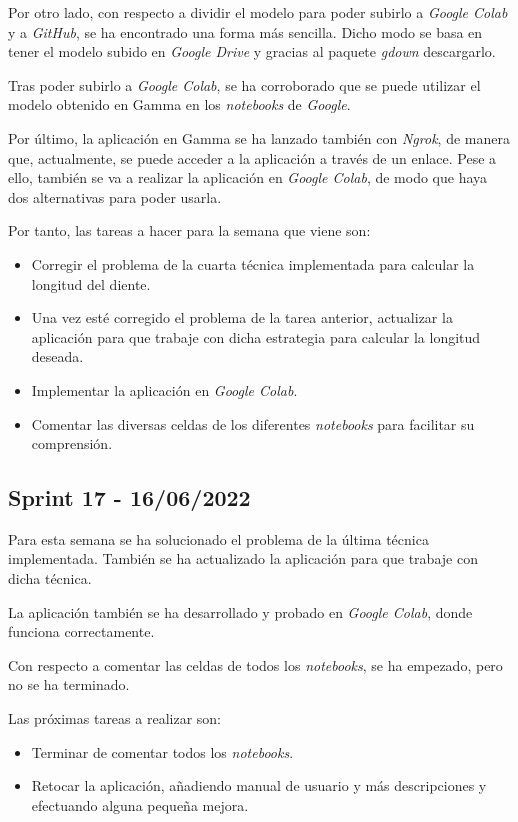 Por otro lado, con respecto a dividir el modelo para poder subirlo a \emph{Google Colab} y a \emph{GitHub}, se ha encontrado una forma más sencilla. Dicho modo se basa en tener el modelo subido en \emph{Google Drive} y gracias al paquete \emph{gdown} descargarlo.

Tras poder subirlo a \emph{Google Colab}, se ha corroborado que se puede utilizar el modelo obtenido en Gamma en los \emph{notebooks} de \emph{Google}.

Por último, la aplicación en Gamma se ha lanzado también con \emph{Ngrok}, de manera que, actualmente, se puede acceder a la aplicación a través de un enlace. Pese a ello, también se va a realizar la aplicación en \emph{Google Colab}, de modo que haya dos alternativas para poder usarla.

Por tanto, las tareas a hacer para la semana que viene son:
\begin{itemize}
    \item Corregir el problema de la cuarta técnica implementada para calcular la longitud del diente.
    \item Una vez esté corregido el problema de la tarea anterior, actualizar la aplicación para que trabaje con dicha estrategia para calcular la longitud deseada.
    \item Implementar la aplicación en \emph{Google Colab}.
    \item Comentar las diversas celdas de los diferentes \emph{notebooks} para facilitar su comprensión. 
\end{itemize}

\subsection{Sprint 17 - 16/06/2022}
Para esta semana se ha solucionado el problema de la última técnica implementada. También se ha actualizado la aplicación para que trabaje con dicha técnica.

La aplicación también se ha desarrollado y probado en \emph{Google Colab}, donde funciona correctamente.

Con respecto a comentar las celdas de todos los \emph{notebooks}, se ha empezado, pero no se ha terminado.

Las próximas tareas a realizar son:
\begin{itemize}
    \item Terminar de comentar todos los \emph{notebooks}.
    \item Retocar la aplicación, añadiendo manual de usuario y más descripciones y efectuando alguna pequeña mejora.
\end{itemize}


